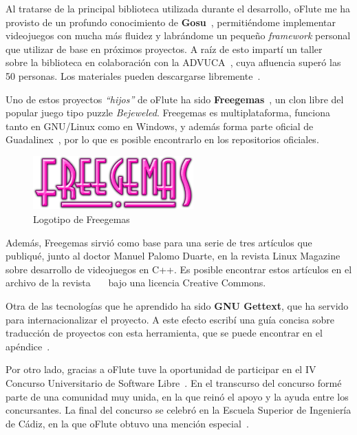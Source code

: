 Al tratarse de la principal biblioteca utilizada durante el desarrollo, oFlute
me ha provisto de un profundo conocimiento de \textbf{Gosu}~\cite{gosu},
permitiéndome implementar videojuegos con mucha más fluidez y labrándome un
pequeño \textit{framework} personal que utilizar de base en próximos
proyectos. A raíz de esto impartí un taller~\cite{tallergosu} sobre la
biblioteca en colaboración con la ADVUCA~\cite{advuca}, cuya
afluencia superó las 50 personas. Los materiales pueden descargarse
libremente~\cite{tallergosumateriales}.

Uno de estos proyectos \textit{``hijos''} de oFlute ha sido
\textbf{Freegemas}~\cite{freegemas}, un clon libre del popular juego tipo puzzle
\textit{Bejeweled}. Freegemas es multiplataforma, funciona tanto en GNU/Linux
como en Windows, y además forma parte oficial de Guadalinex~\cite{guadalinex},
por lo que es posible encontrarlo en los repositorios oficiales. 

\begin{figure}[h!]
  \centering
  \includegraphics[width=0.55\textwidth]{8_conclusiones/imagen_freegemas}
  \caption{Logotipo de Freegemas}
\end{figure}

Además, Freegemas sirvió como base para una serie de tres artículos que
publiqué, junto al doctor Manuel Palomo Duarte, en la revista Linux
Magazine~\cite{linuxmagazine} sobre desarrollo de videojuegos en C++. Es posible
encontrar estos artículos en el archivo de la
revista~\cite{refarticulo1}~\cite{refarticulo2}~\cite{refarticulo3} bajo una
licencia Creative Commons.

Otra de las tecnologías que he aprendido ha sido \textbf{GNU Gettext}, que ha
servido para internacionalizar el proyecto. A este efecto escribí una guía
concisa sobre traducción de proyectos con esta herramienta, que se puede
encontrar en el apéndice~\textit{}.

Por otro lado, gracias a oFlute tuve la oportunidad de participar en el IV
Concurso Universitario de Software Libre~\cite{cusl}. En el transcurso del
concurso formé parte de una comunidad muy unida, en la que reinó el apoyo y la
ayuda entre los concursantes. La final del concurso se celebró en la Escuela
Superior de Ingeniería de Cádiz, en la que oFlute obtuvo una mención
especial~\cite{cusl2}.

